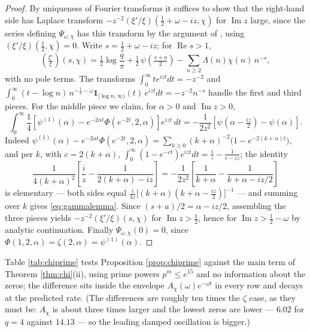 \documentclass[11pt,reqno]{amsart}
\theoremstyle{plain}
\theoremstyle{definition}
\newcommand{\Rp}{\operatorname{Re}}
\newcommand{\Ip}{\operatorname{Im}}
\newcommand{\lxi}[1]{\left(\tfrac{\xi'}{\xi}\right)\!#1}
\begin{document}
\begin{proof}
By uniqueness of Fourier transforms it suffices to show that the right-hand side has Laplace
transform $-z^{-2}(\xi'/\xi)(\tfrac12+\omega-iz,\chi)$ for $\Ip z$ large, since the series
defining $\Psi_{\omega,\chi}$ has this transform by the argument of
\cite[\S\S2.2, 11]{Suzuki2023}, using $(\xi'/\xi)(\tfrac12,\chi)=0$. Write $s=\tfrac12+\omega-iz$;
for $\Rp s>1$,
\[
  \lxi{(s,\chi)}=\tfrac12\log\frac q\pi+\tfrac12\,\psi\!\left(\tfrac{s+a}2\right)
  -\sum_{n\ge2}\Lambda(n)\chi(n)\,n^{-s},
\]
with no pole terms. The transforms $\int_0^\infty te^{izt}dt=-z^{-2}$ and
$\int_0^\infty(t-\log n)\,n^{-\frac12-\omega}\mathbf 1_{[\log n,\infty)}(t)\,e^{izt}dt
 =-z^{-2}n^{-s}$ handle the first and third pieces. For the middle piece we claim, for $\alpha>0$
and $\Ip z>0$,
\begin{equation}\label{eq:gammalemma}
  \int_0^\infty\frac14\left[\psi^{(1)}(\alpha)-e^{-2\alpha t}\Phi(e^{-2t},2,\alpha)\right]
  e^{izt}\,dt
  =-\frac1{2z^{2}}\left[\psi\!\left(\alpha-\tfrac{iz}2\right)-\psi(\alpha)\right].
\end{equation}
Indeed $\psi^{(1)}(\alpha)-e^{-2\alpha t}\Phi(e^{-2t},2,\alpha)
 =\sum_{k\ge0}(k+\alpha)^{-2}\bigl(1-e^{-2(k+\alpha)t}\bigr)$, and per $k$, with
$c=2(k+\alpha)$, $\int_0^\infty(1-e^{-ct})e^{izt}dt=\tfrac iz-\tfrac1{c-iz}$; the identity
\[
  \frac1{4(k+\alpha)^{2}}\left[\frac iz-\frac1{2(k+\alpha)-iz}\right]
  =-\frac1{2z^{2}}\left[\frac1{k+\alpha}-\frac1{k+\alpha-iz/2}\right]
\]
is elementary --- both sides equal
$\tfrac{i}{4z}\bigl[(k+\alpha)(k+\alpha-\tfrac{iz}2)\bigr]^{-1}$ --- and summing over $k$ gives
\eqref{eq:gammalemma}. Since $(s+a)/2=\alpha-iz/2$, assembling the three pieces yields
$-z^{-2}(\xi'/\xi)(s,\chi)$ for $\Ip z>\tfrac12$, hence for $\Ip z>\tfrac12-\omega$ by analytic
continuation. Finally $\Psi_{\omega,\chi}(0)=0$, since
$\Phi(1,2,\alpha)=\zeta(2,\alpha)=\psi^{(1)}(\alpha)$.
\end{proof}

Table \ref{tab:chiprime} tests Proposition \ref{prop:chiprime} against the main term of Theorem
\ref{thm:chi}(ii), using prime powers $p^{m}\le e^{15}$ and no information about the zeros; the
difference sits inside the envelope $A_\chi(\omega)e^{-\omega t}$ in every row and decays at the
predicted rate. (The differences are roughly ten times the $\zeta$ case, as they must be:
$A_\chi$ is about three times larger and the lowest zeros are lower --- $6.02$ for $q=4$ against
$14.13$ --- so the leading damped oscillation is bigger.)
\end{document}
